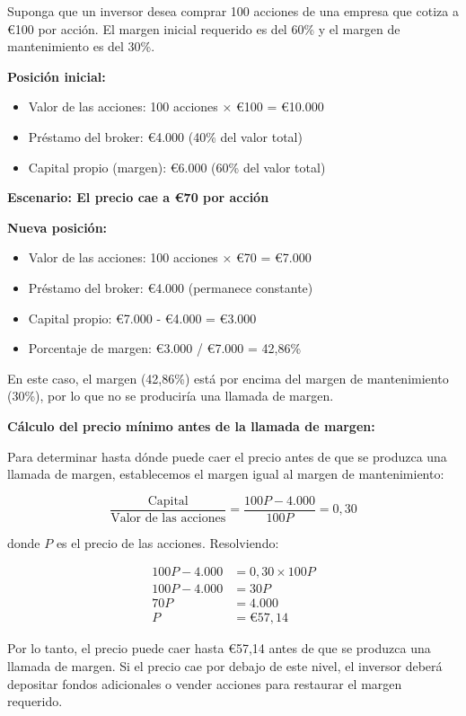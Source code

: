 \begin{ejemplo}
Suponga que un inversor desea comprar 100 acciones de una empresa que cotiza a €100 por acción. El margen inicial requerido es del 60\% y el margen de mantenimiento es del 30\%.

\textbf{Posición inicial:}
\begin{itemize}
\item Valor de las acciones: 100 acciones × €100 = €10.000
\item Préstamo del broker: €4.000 (40\% del valor total)
\item Capital propio (margen): €6.000 (60\% del valor total)
\end{itemize}

\textbf{Escenario: El precio cae a €70 por acción}

\textbf{Nueva posición:}
\begin{itemize}
\item Valor de las acciones: 100 acciones × €70 = €7.000
\item Préstamo del broker: €4.000 (permanece constante)
\item Capital propio: €7.000 - €4.000 = €3.000
\item Porcentaje de margen: €3.000 / €7.000 = 42,86\%
\end{itemize}

En este caso, el margen (42,86\%) está por encima del margen de mantenimiento (30\%), por lo que no se produciría una llamada de margen.

\textbf{Cálculo del precio mínimo antes de la llamada de margen:}

Para determinar hasta dónde puede caer el precio antes de que se produzca una llamada de margen, establecemos el margen igual al margen de mantenimiento:

\begin{equation}
\frac{\text{Capital}}{\text{Valor de las acciones}} = \frac{100P - 4.000}{100P} = 0,30
\end{equation}

donde $P$ es el precio de las acciones. Resolviendo:

\begin{align}
100P - 4.000 &= 0,30 \times 100P \\
100P - 4.000 &= 30P \\
70P &= 4.000 \\
P &= €57,14
\end{align}

Por lo tanto, el precio puede caer hasta €57,14 antes de que se produzca una llamada de margen. Si el precio cae por debajo de este nivel, el inversor deberá depositar fondos adicionales o vender acciones para restaurar el margen requerido.
\end{ejemplo}

